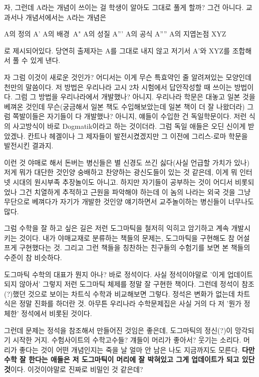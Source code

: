 자, 그런데 A라는 개념이 쓰이는 걸 학생이 알아도 그대로 풀게 할까?
그건 아니다.
교과서나 개념서에서는 A라는 개념은
\vspace{5mm}

A의 정의 A'
A의 배경 A"
A의 성질 A'''
A의 공식 A''''
A의 지엽논점 XYZ
\vspace{5mm}

로 제시되어있다. 당연히 출제자는 A를 그대로 내지 않고 저기서 A'와 XYZ를 조합해서 풀 수 있게 낸다.
\vspace{5mm}

자 그럼 이것이 새로운 것인가? 어디서는 이게 무슨 특효약인 줄 알려져있는 모양인데 천만의 말씀이다.
저 방법은 우리나라 고시 2차 시험에서 답안작성할 때 쓰이는 방법이다.
그럼 그 방법을 우리나라에서 개발했나?
아니지. 우리나라 학문은 대놓고 일본 것을 베껴온 것인데 무슨(궁금해서 일본 책도 수입해보았는데 일본 책이 더 잘 나왔더라)
그럼 쪽발이들은 자기들이 다 개발했나?
아니지, 얘들이 수입한 건 독일학문이다. 저런 식의 사고방식이 바로 Dogmatik이라고 하는 것이더라.
그럼 독일 애들은 오딘 신이게 받았겠나.
칸트나 헤겔이나 그 제자들이 발전시켰겠지만 그 이전에 그리스-로마 학문을 발전시킨 결과지.
\vspace{5mm}

이런 것 야매로 해서 돈버는 병신들은 별 신경도 쓰긴 싫다(사실 언급할 가치가 있나)
저게 뭐가 대단한 것인양 숭배하고 찬양하는 광신도들이 있는 것 같은데, 이게 뭐 인터넷 시대의 원시부족 추장놀이도 아니고.
하지만 자기들이 공부하는 것이 어디서 비롯되었나 그건 치열하게 추적하고 근원을 파악해야 하는데
이 놈의 나라는 외국 것을 그냥 무단으로 베껴다가 자기가 개발한 것인양 얘기하면서 교주놀이하는 병신들이 너무나도 많다.
\vspace{5mm}

그럼 수학을 잘 하고 싶은 길은 저런 도그마틱을 철저히 익히고 암기하고 계속 개발시키는 것이다.
내가 야매교재로 분류하는 책들의 문제는, 도그마틱을 구현해도 참 어설프게 구현했다는 것.
그리고 그런 책들을 칭찬하는 친구들의 수험기를 보면 본 책들의 수준이 참 비슷하다.
\vspace{5mm}

도그마틱 수학의 대표가 뭔지 아나? 바로 정석이다.
사실 정석이야말로 '이게 업데이트 되지 않아서' 그렇지 저런 도그마틱 체제를 정말 잘 구현한 책이다.
그런데 정석이 참조(?)했던 것으로 보이는 차트식 수학과 비교해보면 그렇다. 정석은 변화가 없는데 차트식은 정말 진화를 하더란 것.
아무튼 우리나라 수학문제집은 사실 거의 다 저 '뭔가 정체한' 정석에서 비롯된 것이다.
\vspace{5mm}

그런데 문제는 정석을 참조해서 만들어진 것임은 좋은데, 도그마틱의 정신(?)이 망각되기 시작한 거지.
수험사이트의 수학고수들? 걔들이 머리가 좋아서? 웃기는 소리다.
머리가 좋다는 것이 어떤 개념인지는 죽을 날 얼마 안 남은 나도 지금까지도 모른다.
\textbf{다만 수학 잘 한다는 애들은 저 도그마틱이 머리에 잘 박혀있고 그게 업데이트가 되고 있단것}이다.
이것이야말로 진짜로 비밀인 것 같은데?
\vspace{5mm}

